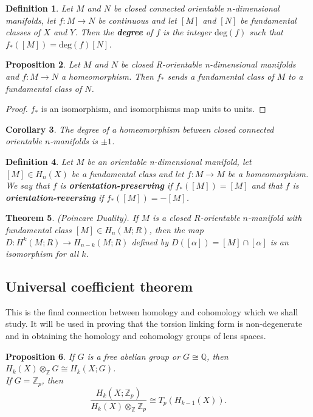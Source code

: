 \documentclass{article}
\newtheorem{theorem}{Theorem}[section]
\newtheorem{definition}[theorem]{Definition}
\newtheorem{proposition}[theorem]{Proposition}
\newtheorem{corollary}[theorem]{Corollary}
\begin{document}
\begin{definition}
Let $M$ and $N$ be closed connected orientable $n$-dimensional manifolds, let $f\colon M\to N$ be continuous and let $[M]$ and $[N]$ be fundamental classes of $X$ and $Y$. Then the \textbf{degree} of $f$ is the integer $\text{deg}(f)$ such that $f_*([M])=\text{deg}(f)[N]$.
\end{definition}

\begin{proposition}
Let $M$ and $N$ be closed R-orientable n-dimensional manifolds and $f\colon M\to N$ a homeomorphism. Then $f_*$ sends a fundamental class of $M$ to a fundamental class of $N$.
\end{proposition}
\begin{proof}
$f_*$ is an isomorphism, and isomorphisms map units to units.
\end{proof}

\begin{corollary}
The degree of a homeomorphism between closed connected orientable $n$-manifolds is $\pm 1$.
\end{corollary}

\begin{definition}
Let $M$ be an orientable n-dimensional manifold, let $[M]\in H_n(X)$ be a fundamental class and let $f\colon M\to M$ be a homeomorphism. We say that $f$ is \textbf{orientation-preserving} if $f_*([M])=[M]$ and that $f$ is \textbf{orientation-reversing} if $f_*([M])=-[M]$.
\end{definition}




\begin{theorem}
(Poincare Duality). If $M$ is a closed $R$-orientable $n$-manifold with fundamental class $[M]\in H_n(M;R)$, then the map $D\colon H^k(M;R)\to H_{n-k}(M;R)$ defined by $D([\alpha])=[M]\cap[\alpha]$ is an isomorphism for all $k$.
\end{theorem}



\subsection{Universal coefficient theorem}
This is the final connection between homology and cohomology which we shall study. It will be used in proving that the torsion linking form is non-degenerate and in obtaining the homology and cohomology groups of lens spaces.
\begin{proposition}
If $G$ is a free abelian group or $G\cong\mathbb{Q}$, then $H_k(X)\otimes_\mathbb{Z}G\cong H_k(X;G)$.\\
If $G=\mathbb{Z}_p$, then \[\frac{H_k(X;\mathbb{Z}_p)}{H_k(X)\otimes_\mathbb{Z}\mathbb{Z}_p}\cong T_p(H_{k-1}(X)).\]
\end{proposition}
\end{document}
